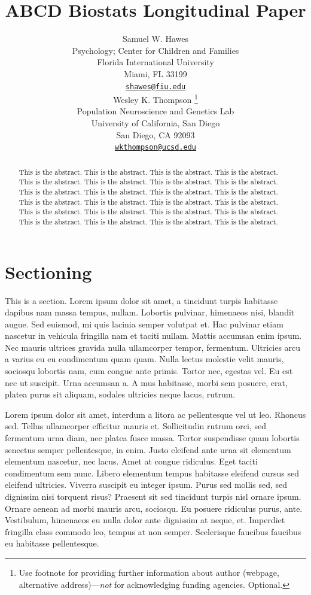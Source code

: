 \documentclass{article}
\title{ABCD Biostats Longitudinal Paper}
\author{
    Samuel W. Hawes
   \\
    Psychology; Center for Children and Families \\
    Florida International University \\
  Miami, FL 33199 \\
  \texttt{\href{mailto:shawes@fiu.edu}{\nolinkurl{shawes@fiu.edu}}} \\
   \And
    Wesley K. Thompson
    \thanks{Use footnote for providing further information about author (webpage, alternative address)---\emph{not} for acknowledging funding agencies. Optional.}
   \\
    Population Neuroscience and Genetics Lab \\
    University of California, San Diego \\
  San Diego, CA 92093 \\
  \texttt{\href{mailto:wkthompson@ucsd.edu}{\nolinkurl{wkthompson@ucsd.edu}}} \\
  }
\begin{document}
\maketitle

\def\tightlist{}


\begin{abstract}
This is the abstract. This is the abstract. This is the abstract.
This is the abstract. This is the abstract. This is the abstract.
This is the abstract. This is the abstract. This is the abstract.
This is the abstract. This is the abstract. This is the abstract.
This is the abstract. This is the abstract. This is the abstract.
This is the abstract. This is the abstract. This is the abstract.
This is the abstract. This is the abstract. This is the abstract.
This is the abstract. This is the abstract. This is the abstract.
\end{abstract}


\hypertarget{sectioning}{%
\section{Sectioning}\label{sectioning}}

This is a section. Lorem ipsum dolor sit amet, a tincidunt turpis habitasse dapibus nam massa tempus, nullam. Lobortis pulvinar, himenaeos nisi, blandit augue. Sed euismod, mi quis lacinia semper volutpat et. Hac pulvinar etiam nascetur in vehicula fringilla nam et taciti nullam. Mattis accumsan enim ipsum. Nec mauris ultrices gravida nulla ullamcorper tempor, fermentum. Ultricies arcu a varius eu eu condimentum quam quam. Nulla lectus molestie velit mauris, sociosqu lobortis nam, cum congue ante primis. Tortor nec, egestas vel. Eu est nec ut suscipit. Urna accumsan a. A mus habitasse, morbi sem posuere, erat, platea purus sit aliquam, sodales ultricies neque lacus, rutrum.

Lorem ipsum dolor sit amet, interdum a litora ac pellentesque vel ut leo. Rhoncus sed. Tellus ullamcorper efficitur mauris et. Sollicitudin rutrum orci, sed fermentum urna diam, nec platea fusce massa. Tortor suspendisse quam lobortis senectus semper pellentesque, in enim. Justo eleifend ante urna sit elementum elementum nascetur, nec lacus. Amet at congue ridiculus. Eget taciti condimentum sem nunc. Libero elementum tempus habitasse eleifend cursus sed eleifend ultricies. Viverra suscipit eu integer ipsum. Purus sed mollis sed, sed dignissim nisi torquent risus? Praesent sit sed tincidunt turpis nisl ornare ipsum. Ornare aenean ad morbi mauris arcu, sociosqu. Eu posuere ridiculus purus, ante. Vestibulum, himenaeos eu nulla dolor ante dignissim at neque, et. Imperdiet fringilla class commodo leo, tempus at non semper. Scelerisque faucibus faucibus eu habitasse pellentesque.
\end{document}
